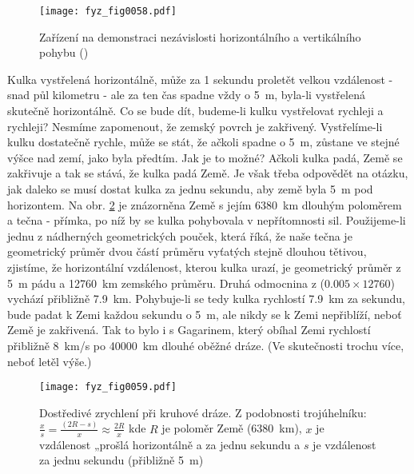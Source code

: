     \begin{figure}[ht!]  %
      \centering
      \texttt{[image: fyz\_fig0058.pdf]}
      \caption{Zařízení na demonstraci nezávislosti horizontálního a vertikálního pohybu 
               (\cite[s.~96]{Feynman01})}
      \label{fyz:fig0058}
    \end{figure}
    Kulka vystřelená horizontálně, může za \num{1} sekundu proletět velkou vzdálenost - snad půl 
    kilometru - ale za ten čas spadne vždy o \qty{5}{\m}, byla-li vystřelená skutečně horizontálně. 
    Co se bude dít, budeme-li kulku vystřelovat rychleji a rychleji? Nesmíme zapomenout, že zemský 
    povrch je zakřivený. Vystřelíme-li kulku dostatečně rychle, může se stát, že ačkoli spadne o 
    \qty{5}{\m}, zůstane ve stejné výšce nad zemí, jako byla předtím. Jak je to možné? Ačkoli kulka 
    padá, Země se zakřivuje a tak se stává, že kulka padá  Země. Je však třeba odpovědět 
    na otázku, jak daleko se musí dostat kulka za jednu sekundu, aby země byla \qty{5}{\m} pod 
    horizontem. Na obr. \ref{fyz:fig0059} je znázorněna Země s jejím \qty{6380}{\km} dlouhým 
    poloměrem a tečna - přímka, po níž by se kulka pohybovala v nepřítomnosti sil. Použijeme-li 
    jednu z nádherných geometrických pouček, která říká, že naše tečna je geometrický průměr dvou 
    částí průměru vyťatých stejně dlouhou tětivou, zjistíme, že horizontální vzdálenost, kterou 
    kulka urazí, je geometrický průměr z \qty{5}{\m} pádu a \qty{12760}{\km} zemského průměru. Druhá 
    odmocnina z (\(\num{0.005}\times\num{12760}\)) vychází přibližně \qty{7.9}{\km}. Pohybuje-li se 
    tedy kulka rychlostí \qty{7.9}{\km} za sekundu, bude padat k Zemi každou sekundu o \qty{5}{\m}, 
    ale nikdy se k Zemi nepřiblíží, neboť Země je zakřivená. Tak to bylo i s Gagarinem, který 
    obíhal Zemi rychlostí přibližně \qty{8}{\km/\second} po \qty{40000}{\km} dlouhé oběžné dráze. (Ve 
    skutečnosti trochu více, neboť letěl výše.)

    \begin{figure}[ht!]  %
      \centering
      \texttt{[image: fyz\_fig0059.pdf]}
      \caption{Dostředivé zrychlení při kruhové dráze. Z podobnosti trojúhelníku: \(\frac{x}{s} = 
               \frac{(2R - s)}{x} \approx \frac{2R}{x}\) kde \(R\) je poloměr Země             
               (\qty{6380}{\km}), \(x\) je vzdálenost „prošlá horizontálně a za jednu sekundu a
               \(s\) je vzdálenost  za jednu sekundu (přibližně \qty{5}{\m})
               \cite[s.~97]{Feynman01}}
       \label{fyz:fig0059}
    \end{figure}
    
